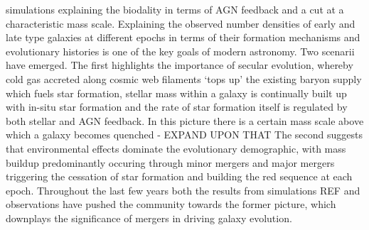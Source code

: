 \documentclass[a4paper,fleqn,usenatbib]{mn2e}
\begin{document}
\citep{Baldry2006}
simulations explaining the biodality in terms of AGN feedback and a cut at a characteristic mass scale.
\citep{Birnboim2003,Dekel2006,Keres2005,Bower2006,Croton2006}
Explaining the observed number densities of early and late type galaxies at different epochs in terms of their formation mechanisms and evolutionary histories is one of the key goals of modern astronomy.
Two scenarii have emerged. The first highlights the importance of secular evolution, whereby cold gas accreted along cosmic web filaments `tops up' the existing baryon supply which fuels star formation, stellar mass within a galaxy is continually built up with in-situ star formation and the rate of star formation itself is regulated by both stellar and AGN feedback.
In this picture there is a certain mass scale above which a galaxy becomes quenched - EXPAND UPON THAT
The second suggests that environmental effects dominate the evolutionary demographic, with mass buildup predominantly occuring through minor mergers and major mergers triggering the cessation of star formation and building the red sequence at each epoch.  
Throughout the last few years both the results from simulations REF and observations have pushed the community towards the former picture, which downplays the significance of mergers in driving galaxy evolution. 









\end{document}
